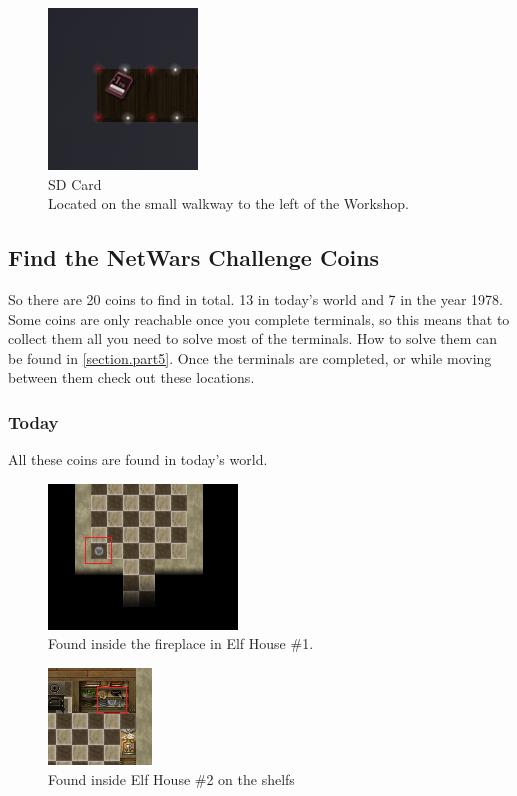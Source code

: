 \documentclass[writeup.tex]{subfiles}
\begin{document}
		\begin{figure}[H]
			\centering
			\includegraphics[scale=1]{"screenshots/items/Cranberry Pi - SD Card"}
			\caption{SD Card\\Located on the small walkway to the left of the Workshop.}
		\end{figure}
		
		
	\subsection{Find the NetWars Challenge Coins} \label{subsection.quest_find_netcoins}
		So there are 20 coins to find in total. 13 in today's world and 7 in the year 1978. Some coins are only reachable once you complete terminals, so this means that to collect them all you need to solve most of the terminals. How to solve them can be found in \autoref{section.part5}. Once the terminals are completed, or while moving between them check out these locations.
		
		\subsubsection*{Today}
			All these coins are found in today's world.
			\begin{figure}[H]
				\centering
				\includegraphics[scale=1]{"screenshots/coins/Netcoin - Elf House 1 - Secret Fireplace Room"}
				\caption{Found inside the fireplace in Elf House \#1.}
			\end{figure}
			
			\begin{figure}[H]
				\centering
				\includegraphics[scale=1]{"screenshots/coins/Netcoin - Elf House 2 - On shelf"}
				\caption{Found inside Elf House \#2 on the shelfs}
			\end{figure}
			
\end{document}
